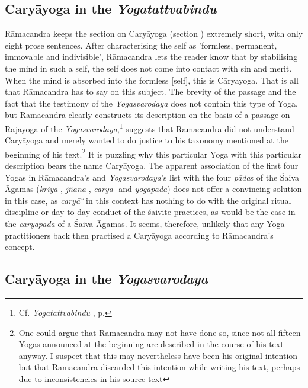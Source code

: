 \subsection{Caryāyoga in the \textit{Yogatattvabindu}}

Rāmacandra keeps the section on Caryāyoga (section ) extremely short, with only eight prose sentences. After characterising the self as 'formless, permanent, immovable and indivisible', Rāmacandra lets the reader know that by stabilising the mind in such a self, the self does not come into contact with sin and merit. When the mind is absorbed into the formless [self], this is Cāryayoga. That is all that Rāmacandra has to say on this subject. The brevity of the passage and the fact that the testimony of the \textit{Yogasvarodaya} does not contain this type of Yoga, but Rāmacandra clearly constructs its description on the basis of a passage on Rājayoga of the \textit{Yogasvarodaya},\footnote{Cf. \textit{Yogatattvabindu} , p. \pageref{caryayoga}} suggests that Rāmacandra did not understand Caryāyoga and merely wanted to do justice to his taxonomy mentioned at the beginning of his text.\footnote{One could argue that Rāmacandra may not have done so, since not all fifteen Yogas announced at the beginning are described in the course of his text anyway. I suspect that this may nevertheless have been his original intention but that Rāmacandra discarded this intention while writing his text, perhaps due to inconsistencies in his source text} It is puzzling why this particular Yoga with this particular description bears the name Caryāyoga. The apparent association of the first four Yogas in Rāmacandra's and \textit{Yogasvarodaya}'s list with the four \textit{pāda}s of the Śaiva Āgamas (\textit{kriyā}-, \textit{jñāna}-, \textit{caryā}- and \textit{yogapāda}) does not offer a convincing solution in this case, as \textit{caryā°} in this context has nothing to do with the original ritual discipline or day-to-day conduct of the śaivite practices, as would be the case in the \textit{caryāpada} of a Śaiva Āgamas. It seems, therefore, unlikely that any Yoga practitioners back then practised a Caryāyoga according to Rāmacandra's concept. 

\subsection{Caryāyoga in the \textit{Yogasvarodaya}}


